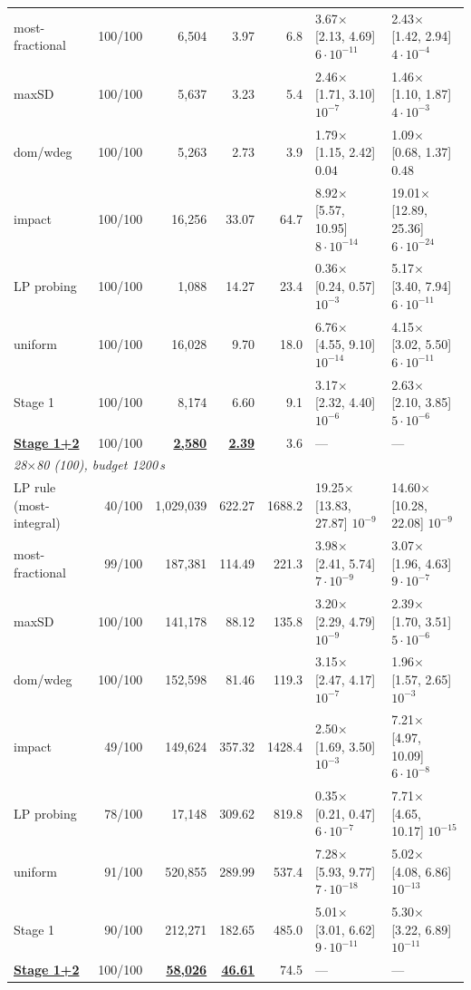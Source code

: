 \begin{table}[t]
\begin{tabular}{lrrrrll}
most-fractional & 100/100 & 6,504 & 3.97 & 6.8 & 3.67$\times$ [2.13, 4.69] $6\cdot10^{-11}$ & 2.43$\times$ [1.42, 2.94] $4\cdot10^{-4}$ \\
maxSD & 100/100 & 5,637 & 3.23 & 5.4 & 2.46$\times$ [1.71, 3.10] $10^{-7}$ & 1.46$\times$ [1.10, 1.87] $4\cdot10^{-3}$ \\
dom/wdeg & 100/100 & 5,263 & 2.73 & 3.9 & 1.79$\times$ [1.15, 2.42] $0.04$ & 1.09$\times$ [0.68, 1.37] $0.48$ \\
impact & 100/100 & 16,256 & 33.07 & 64.7 & 8.92$\times$ [5.57, 10.95] $8\cdot10^{-14}$ & 19.01$\times$ [12.89, 25.36] $6\cdot10^{-24}$ \\
LP probing & 100/100 & 1,088 & 14.27 & 23.4 & 0.36$\times$ [0.24, 0.57] $10^{-3}$ & 5.17$\times$ [3.40, 7.94] $6\cdot10^{-11}$ \\
uniform & 100/100 & 16,028 & 9.70 & 18.0 & 6.76$\times$ [4.55, 9.10] $10^{-14}$ & 4.15$\times$ [3.02, 5.50] $6\cdot10^{-11}$ \\
Stage 1 & 100/100 & 8,174 & 6.60 & 9.1 & 3.17$\times$ [2.32, 4.40] $10^{-6}$ & 2.63$\times$ [2.10, 3.85] $5\cdot10^{-6}$ \\
\textbf{\underline{Stage 1+2}} & 100/100 & \textbf{\underline{2,580}} & \textbf{\underline{2.39}} & 3.6 & --- & --- \\
\midrule
\multicolumn{7}{l}{\emph{28$\times$80 (100), budget 1200\,s}} \\
LP rule (most-integral) & 40/100 & 1,029,039 & 622.27 & 1688.2 & 19.25$\times$ [13.83, 27.87] $10^{-9}$ & 14.60$\times$ [10.28, 22.08] $10^{-9}$ \\
most-fractional & 99/100 & 187,381 & 114.49 & 221.3 & 3.98$\times$ [2.41, 5.74] $7\cdot10^{-9}$ & 3.07$\times$ [1.96, 4.63] $9\cdot10^{-7}$ \\
maxSD & 100/100 & 141,178 & 88.12 & 135.8 & 3.20$\times$ [2.29, 4.79] $10^{-9}$ & 2.39$\times$ [1.70, 3.51] $5\cdot10^{-6}$ \\
dom/wdeg & 100/100 & 152,598 & 81.46 & 119.3 & 3.15$\times$ [2.47, 4.17] $10^{-7}$ & 1.96$\times$ [1.57, 2.65] $10^{-3}$ \\
impact & 49/100 & 149,624 & 357.32 & 1428.4 & 2.50$\times$ [1.69, 3.50] $10^{-3}$ & 7.21$\times$ [4.97, 10.09] $6\cdot10^{-8}$ \\
LP probing & 78/100 & 17,148 & 309.62 & 819.8 & 0.35$\times$ [0.21, 0.47] $6\cdot10^{-7}$ & 7.71$\times$ [4.65, 10.17] $10^{-15}$ \\
uniform & 91/100 & 520,855 & 289.99 & 537.4 & 7.28$\times$ [5.93, 9.77] $7\cdot10^{-18}$ & 5.02$\times$ [4.08, 6.86] $10^{-13}$ \\
Stage 1 & 90/100 & 212,271 & 182.65 & 485.0 & 5.01$\times$ [3.01, 6.62] $9\cdot10^{-11}$ & 5.30$\times$ [3.22, 6.89] $10^{-11}$ \\
\textbf{\underline{Stage 1+2}} & 100/100 & \textbf{\underline{58,026}} & \textbf{\underline{46.61}} & 74.5 & --- & --- \\
\bottomrule
\end{tabular}
\end{table}